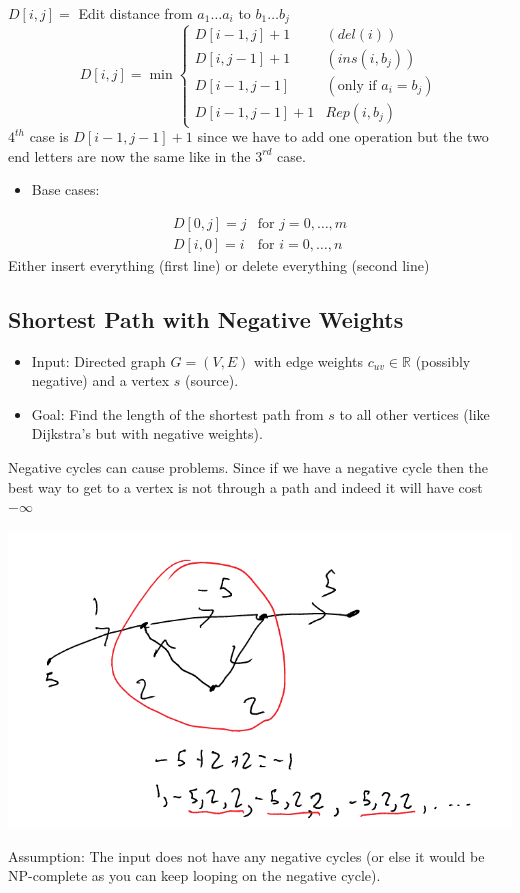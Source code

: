 \documentclass[11pt]{article}
\begin{document}
\(D[i,j]=\) Edit distance from \(a_1 \ldots a_i\) to \(b_1 \ldots b_j\)
\begin{equation*}
D[i,j] = \min 
\begin{cases}
D[i-1,j]+1 & (del(i))
\\ D[i,j-1]+1 & (ins(i,b_j))
\\ D[i-1, j-1] & (\text{only if $a_i=b_j$})
\\ D[i-1, j-1]+1 & Rep(i,b_j)
\end{cases}
\end{equation*}
\(4^{th}\) case is \(D[i-1, j-1]+1\) since we have to add one operation but the two end letters are now the same like in the \(3^{rd}\) case.
\begin{itemize}
\item Base cases:
\end{itemize}
\begin{align*}
D[0,j] = j & \text{for }j=0,\ldots,m
\\D[i,0] = i & \text{for }i=0,\ldots,n
\end{align*}
Either insert everything (first line) or delete everything (second line)
\subsection{Shortest Path with Negative Weights}
\label{sec:org719cabf}
\begin{itemize}
\item Input: Directed graph \(G=(V,E)\) with edge weights \(c_{uv}\in \mathbb{R}\) (possibly negative) and a vertex \(s\) (source).
\item Goal: Find the length of the shortest path from \(s\) to all other vertices (like Dijkstra's but with negative weights).
\end{itemize}
Negative cycles can cause problems. Since if we have a negative cycle then the best way to get to a vertex is not through a path and indeed it will have cost \(-\infty\)
\begin{center}
\includegraphics[width=.9\linewidth]{./Images/i93.png}
\end{center}
Assumption: The input does not have any negative cycles (or else it would be NP-complete as you can keep looping on the negative cycle).
\end{document}
